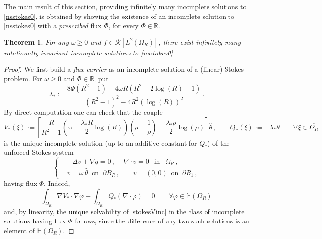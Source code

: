 \documentclass[a4paper,11pt]{article}
\newtheorem{theorem}{Theorem}[section]
\numberwithin{equation}{section}
\numberwithin{figure}{section}
\begin{document}
The main result of this section, providing infinitely many incomplete solutions to \eqref{nsstokes0}, is obtained by
showing the existence of an incomplete solution to \eqref{nsstokes0} with a \textit{prescribed} flux $\Phi$, for every $\Phi \in
\mathbb{R}$.

\begin{theorem} \label{nonuniquetheomain}
For any $\omega \geq 0$ and $f \in \mathcal{R}[L^{2}(\Omega_{R})]$, there exist infinitely many rotationally-invariant incomplete solutions to
\eqref{nsstokes0}.
\end{theorem}
\noindent
\begin{proof} We first build a \textit{flux carrier} as an incomplete solution of a (linear) Stokes problem.
For $\omega \geq 0$ and $\Phi \in \mathbb{R}$, put
\begin{equation} \label{lambdastar}
	\lambda_{*} := \dfrac{8\Phi (R^2 - 1) - 4 \omega R \left( R^2 - 2\log(R) - 1 \right)}{(R^2 - 1)^2 - 4 R^2 (\log(R))^{2}} \, .
\end{equation}
By direct computation one can check that the couple
\begin{equation}\label{fluxcarrier}
V_{*}(\xi) := \left[ \dfrac{R}{R^2 - 1} \left( \omega + \dfrac{\lambda_{*} R}{2} \log(R) \right)  \left( \rho - \dfrac{1}{\rho} \right) -
\dfrac{\lambda_{*} \rho}{2} \log(\rho) \right] \widehat{\theta} \,, \qquad  Q_{*}(\xi) := - \lambda_{*}\theta \qquad \forall \xi \in
\overline{\Omega_{R}}
\end{equation}
is the unique incomplete solution (up to an additive constant for $Q_{*}$) of the unforced Stokes system
\begin{equation}\label{stokesVinc}
	\left\{
	\begin{aligned}
		& -\Delta v+\nabla q=0 \, , \ \quad  \nabla\cdot v=0 \ \ \mbox{ in } \ \ \Omega_{R} \, , \\[3pt]
		& v = \omega \, \widehat{\theta} \ \text{ on } \ \partial B_R \, , \qquad v = (0,0) \ \text{ on } \ \partial B_{1} \, ,
	\end{aligned}
	\right.
\end{equation}
having flux $\Phi$. Indeed,
\begin{equation}\label{lambdastarwf}
\int_{\Omega_R}\nabla V_{*}\cdot\nabla\varphi-\int_{\Omega_{R}}Q_{*}(\nabla\cdot\varphi)=0\qquad\forall\varphi\in
\mathbb{H}(\Omega_R)
\end{equation}
and, by linearity, the unique solvability of \eqref{stokesVinc} in the class of incomplete solutions having flux $\Phi$ follows,
since the difference of any two such solutions is an element of $\mathbb{H}(\Omega_{R})$.\par

\end{proof}
\end{document}
